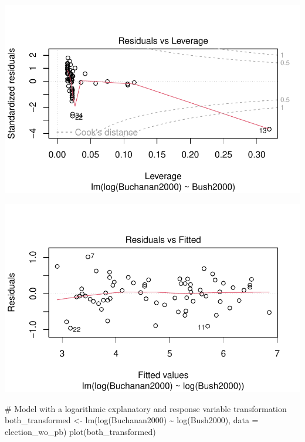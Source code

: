\documentclass[
  letterpaper,
  DIV=11,
  numbers=noendperiod]{scrartcl}
\newenvironment{Shaded}{\begin{snugshade}}{\end{snugshade}}
\newcommand{\AttributeTok}[1]{\textcolor[rgb]{0.40,0.45,0.13}{#1}}
\newcommand{\CommentTok}[1]{\textcolor[rgb]{0.37,0.37,0.37}{#1}}
\newcommand{\FunctionTok}[1]{\textcolor[rgb]{0.28,0.35,0.67}{#1}}
\newcommand{\NormalTok}[1]{\textcolor[rgb]{0.00,0.23,0.31}{#1}}
\newcommand{\OtherTok}[1]{\textcolor[rgb]{0.00,0.23,0.31}{#1}}
\newcommand{\SpecialCharTok}[1]{\textcolor[rgb]{0.37,0.37,0.37}{#1}}
\begin{document}
\includegraphics{case_study_1_files/figure-pdf/unnamed-chunk-6-13.pdf}

\includegraphics{case_study_1_files/figure-pdf/unnamed-chunk-6-14.pdf}

\begin{Shaded}
\begin{Highlighting}[]
\CommentTok{\# Model with a logarithmic explanatory and response variable transformation}
\NormalTok{both\_transformed }\OtherTok{\textless{}{-}} \FunctionTok{lm}\NormalTok{(}\FunctionTok{log}\NormalTok{(Buchanan2000) }\SpecialCharTok{\textasciitilde{}} \FunctionTok{log}\NormalTok{(Bush2000), }\AttributeTok{data =}\NormalTok{ election\_wo\_pb)}
\FunctionTok{plot}\NormalTok{(both\_transformed)}
\end{Highlighting}
\end{Shaded}
\end{document}

